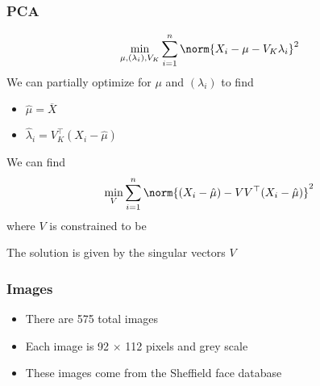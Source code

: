 \documentclass[12pt]{beamer}
\begin{document}
\begin{frame}[fragile]
\frametitle{PCA}
\[
\min_{\mu,(\lambda_i),V_K} \sum_{i=1}^n \norm{X_i - \mu - V_K \lambda_i}^2
\]
We can partially optimize for $\mu$ and $(\lambda_i)$ to find
\begin{itemize}
\item $\hat\mu = \overline{X}$
\item $\hat\lambda_i = V_K^{\top}(X_i - \hat \mu)$
\end{itemize}
\vsp

We can find
\[
\min_{V } \sum_{i=1}^n \norm{(X_i - \hat\mu) - V V^{\top}(X_i - \hat\mu)}^2
\]
where $V$ is constrained to be 

\vsp

The solution is given by the singular vectors $V$
\end{frame}
%
%
%

\begin{frame}[fragile]
\frametitle{Images}
\begin{itemize}
\item There are 575 total images
\item Each image is 92 $\times$ 112 pixels and grey scale
\item These images come from the Sheffield face database 

\end{itemize}
\end{frame}
\end{document}
